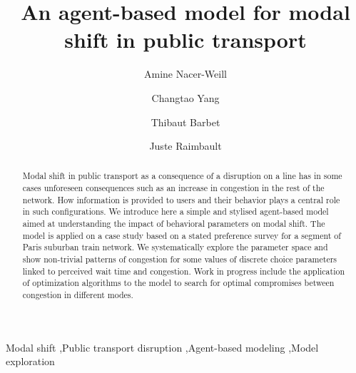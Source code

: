 \documentclass[3p,times,procedia]{elsarticle}
\begin{document}
\begin{frontmatter}


\title{An agent-based model for modal shift in public transport}

\author[a]{Amine Nacer-Weill}
\author[a]{Changtao Yang}
\author[a]{Thibaut Barbet}
\author[b]{Juste Raimbault}

\address[a]{Ecole des Ponts ParisTech, Champs-sur-Marne, France}
\address[b]{CASA, University College London, London, United Kingdom}

\begin{abstract}
Modal shift in public transport as a consequence of a disruption on a line has in some cases unforeseen consequences such as an increase in congestion in the rest of the network. How information is provided to users and their behavior plays a central role in such configurations. We introduce here a simple and stylised agent-based model aimed at understanding the impact of behavioral parameters on modal shift. The model is applied on a case study based on a stated preference survey for a segment of Paris suburban train network. We systematically explore the parameter space and show non-trivial patterns of congestion for some values of discrete choice parameters linked to perceived wait time and congestion. Work in progress include the application of optimization algorithms to the model to search for optimal compromises between congestion in different modes.
\end{abstract}

\begin{keyword}
Modal shift \sep Public transport disruption \sep Agent-based modeling \sep Model exploration
\end{keyword}
\end{frontmatter}






\end{document}
